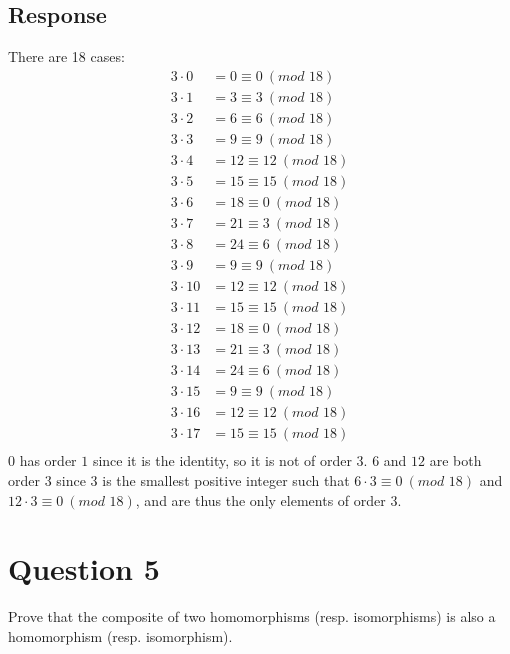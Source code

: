 \documentclass[13pt]{article}
\begin{document}
\subsection*{Response}
There are 18 cases:
\begin{align*}
    3 \cdot 0 &= 0 \equiv 0 \ (\textit{mod } 18) \\
    3 \cdot 1 &= 3 \equiv 3 \ (\textit{mod } 18) \\
    3 \cdot 2 &= 6 \equiv 6 \ (\textit{mod } 18) \\
    3 \cdot 3 &= 9 \equiv 9 \ (\textit{mod } 18) \\
    3 \cdot 4 &= 12 \equiv 12 \ (\textit{mod } 18) \\
    3 \cdot 5 &= 15 \equiv 15 \ (\textit{mod } 18) \\
    3 \cdot 6 &= 18 \equiv 0 \ (\textit{mod } 18) \\
    3 \cdot 7 &= 21 \equiv 3 \ (\textit{mod } 18) \\
    3 \cdot 8 &= 24 \equiv 6 \ (\textit{mod } 18) \\
    3 \cdot 9 &= 9 \equiv 9 \ (\textit{mod } 18) \\
    3 \cdot 10 &= 12 \equiv 12 \ (\textit{mod } 18) \\
    3 \cdot 11 &= 15 \equiv 15 \ (\textit{mod } 18) \\
    3 \cdot 12 &= 18 \equiv 0 \ (\textit{mod } 18) \\
    3 \cdot 13 &= 21 \equiv 3 \ (\textit{mod } 18) \\
    3 \cdot 14 &= 24 \equiv 6 \ (\textit{mod } 18) \\
    3 \cdot 15 &= 9 \equiv 9 \ (\textit{mod } 18) \\
    3 \cdot 16 &= 12 \equiv 12 \ (\textit{mod } 18) \\
    3 \cdot 17 &= 15 \equiv 15 \ (\textit{mod } 18) \\
\end{align*}
$0$ has order $1$ since it is the identity, so it is not of order $3$. $6$ and $12$ are both order 
$3$ since $3$ is the smallest positive integer such that $6 \cdot 3 \equiv 0 \ (\textit{mod } 18)$ and 
$12 \cdot 3 \equiv 0 \ (\textit{mod } 18)$, and are thus the only elements of order $3$.





\newpage
\section*{Question 5}
Prove that the composite of two homomorphisms (resp. isomorphisms) is also a homomorphism
(resp. isomorphism).
\end{document}
